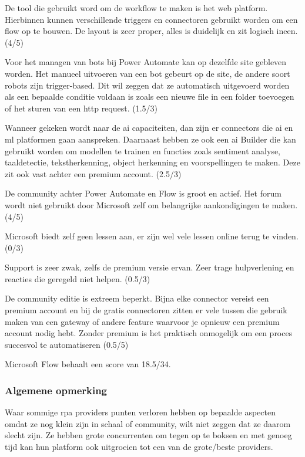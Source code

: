 De tool die gebruikt word om de \gls{workflow} te maken is het web platform. Hierbinnen kunnen verschillende triggers en connectoren gebruikt worden om een flow op te bouwen. De layout is zeer proper, alles is duidelijk en zit logisch ineen. (4/5)

Voor het managen van bots bij Power Automate kan op dezelfde site gebleven worden. Het manueel uitvoeren van een bot gebeurt op de site, de andere soort robots zijn trigger-based. Dit wil zeggen dat ze automatisch uitgevoerd worden als een bepaalde conditie voldaan is zoals een nieuwe file in een folder toevoegen of het sturen van een \acrshort{http} request. (1.5/3)

Wanneer gekeken wordt naar de \acrshort{ai} capaciteiten, dan zijn er connectors die \acrshort{ai} en \acrshort{ml} platformen gaan aanspreken. Daarnaast hebben ze ook een \acrshort{ai} Builder die kan gebruikt worden om modellen te trainen en functies zoals sentiment analyse, taaldetectie, tekstherkenning, object herkenning en voorspellingen te maken. Deze zit ook vast achter een premium account. (2.5/3)

De community achter Power Automate en Flow is groot en actief. Het forum wordt niet gebruikt door Microsoft zelf om belangrijke aankondigingen te maken. (4/5)

Microsoft biedt zelf geen lessen aan, er zijn wel vele lessen online terug te vinden. (0/3)

Support is zeer zwak, zelfs de premium versie ervan. Zeer trage hulpverlening en reacties die geregeld niet helpen. (0.5/3)

De community editie is extreem beperkt. Bijna elke connector vereist een premium account en bij de gratis connectoren zitten er vele tussen die gebruik maken van een gateway of andere feature waarvoor je opnieuw een premium account nodig hebt. Zonder premium is het praktisch onmogelijk om een proces succesvol te automatiseren (0.5/5)

Microsoft Flow behaalt een score van 18.5/34.


\subsubsection{Algemene opmerking}
Waar sommige \acrshort{rpa} providers punten verloren hebben op bepaalde aspecten omdat ze nog klein zijn in schaal of community, wilt niet zeggen dat ze daarom slecht zijn. Ze hebben grote concurrenten om tegen op te boksen en met genoeg tijd kan hun platform ook uitgroeien tot een van de grote/beste providers.

